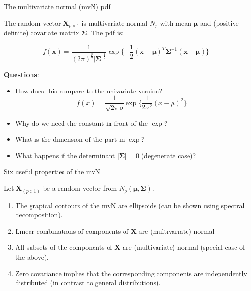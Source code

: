 \documentclass[ignorenonframetext,]{beamer}
\begin{document}
\begin{frame}

\begin{block}{The multivariate normal (mvN) pdf}

\vspace{2mm}

The random vector \(\boldsymbol{X}_{p\times 1}\) is multivariate normal
\(N_p\) with mean \(\boldsymbol{\mu}\) and (positive definite) covariate
matrix \(\boldsymbol\Sigma\). The pdf is:

\[f(\boldsymbol{x})=\frac{1}{(2\pi)^\frac{p}{2}|\boldsymbol\Sigma|^\frac{1}{2}} \exp\{-\frac{1}{2}(\boldsymbol{x}-\boldsymbol{\mu})^T\boldsymbol\Sigma^{-1}(\boldsymbol{x}-\boldsymbol{\mu})\}\]

\textbf{Questions}:

\begin{itemize}
\item
  How does this compare to the univariate version?
  \[f(x)=\frac{1}{\sqrt{2\pi}\sigma}\exp\{ \frac{1}{2\sigma^2}(x-\mu)^2\}\]
\item
  Why do we need the constant in front of the \(\exp\)?
\item
  What is the dimension of the part in \(\exp\)?
\item
  What happens if the determinant \(|\boldsymbol\Sigma| = 0\)
  (degenerate case)? 
\end{itemize}

\end{block}

\end{frame}

\begin{frame}

\begin{block}{Six useful properties of the mvN}

\vspace{2mm}

Let \(\boldsymbol{X}_{(p\times 1)}\) be a random vector from
\(N_p(\boldsymbol{\mu},\boldsymbol\Sigma)\).

\begin{enumerate}
\def\labelenumi{\arabic{enumi}.}
\item
  The grapical contours of the mvN are ellipsoids (can be shown using
  spectral decomposition).
\item
  Linear combinations of components of \(\boldsymbol{X}\) are
  (multivariate) normal
\item
  All subsets of the components of \(\boldsymbol{X}\) are (multivariate)
  normal (special case of the above).
\item
  Zero covariance implies that the corresponding components are
  independently distributed (in contrast to general distributions).
\end{enumerate}

\end{block}

\end{frame}
\end{document}
